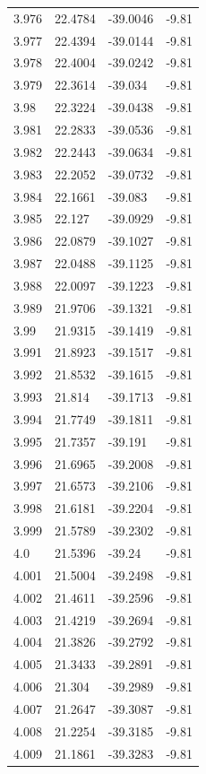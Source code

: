 \begin{tabular}{llll}
3.976 & 22.4784 & -39.0046 & -9.81 \\
3.977 & 22.4394 & -39.0144 & -9.81 \\
3.978 & 22.4004 & -39.0242 & -9.81 \\
3.979 & 22.3614 & -39.034 & -9.81 \\
3.98 & 22.3224 & -39.0438 & -9.81 \\
3.981 & 22.2833 & -39.0536 & -9.81 \\
3.982 & 22.2443 & -39.0634 & -9.81 \\
3.983 & 22.2052 & -39.0732 & -9.81 \\
3.984 & 22.1661 & -39.083 & -9.81 \\
3.985 & 22.127 & -39.0929 & -9.81 \\
3.986 & 22.0879 & -39.1027 & -9.81 \\
3.987 & 22.0488 & -39.1125 & -9.81 \\
3.988 & 22.0097 & -39.1223 & -9.81 \\
3.989 & 21.9706 & -39.1321 & -9.81 \\
3.99 & 21.9315 & -39.1419 & -9.81 \\
3.991 & 21.8923 & -39.1517 & -9.81 \\
3.992 & 21.8532 & -39.1615 & -9.81 \\
3.993 & 21.814 & -39.1713 & -9.81 \\
3.994 & 21.7749 & -39.1811 & -9.81 \\
3.995 & 21.7357 & -39.191 & -9.81 \\
3.996 & 21.6965 & -39.2008 & -9.81 \\
3.997 & 21.6573 & -39.2106 & -9.81 \\
3.998 & 21.6181 & -39.2204 & -9.81 \\
3.999 & 21.5789 & -39.2302 & -9.81 \\
4.0 & 21.5396 & -39.24 & -9.81 \\
4.001 & 21.5004 & -39.2498 & -9.81 \\
4.002 & 21.4611 & -39.2596 & -9.81 \\
4.003 & 21.4219 & -39.2694 & -9.81 \\
4.004 & 21.3826 & -39.2792 & -9.81 \\
4.005 & 21.3433 & -39.2891 & -9.81 \\
4.006 & 21.304 & -39.2989 & -9.81 \\
4.007 & 21.2647 & -39.3087 & -9.81 \\
4.008 & 21.2254 & -39.3185 & -9.81 \\
4.009 & 21.1861 & -39.3283 & -9.81 \\

\end{tabular}
